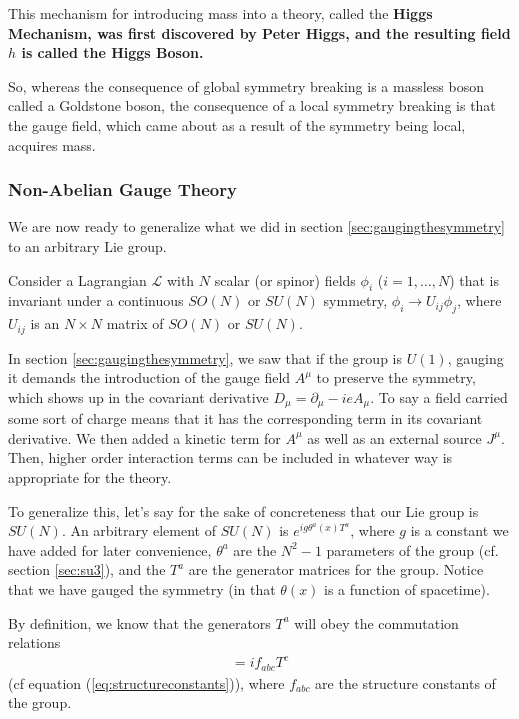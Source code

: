 \documentclass[12pt,epsf]{article}
\def\nolabel{\nonumber }
\def\nolabel{\nonumber }
\begin{document}
This mechanism for introducing mass into a theory, called the \bf Higgs
Mechanism\rm, was first discovered by Peter Higgs, and the resulting
field $h$ is called the \bf Higgs Boson\rm.  

So, whereas the consequence of global symmetry breaking is a massless
boson called a Goldstone boson, the consequence of a local symmetry
breaking is that the gauge field, which came about as a result of the
symmetry being local, acquires mass.  

\subsubsection{Non-Abelian Gauge Theory}
\label{sec:nonabeliangaugetheory}

We are now ready to generalize what we did in section
\ref{sec:gaugingthesymmetry} to an arbitrary Lie group.  

Consider a Lagrangian $\mathcal{L}$ with $N$ scalar (or spinor) fields
$\phi_i$ ($i=1,\ldots,N$) that is invariant under a continuous $SO(N)$
or $SU(N)$ symmetry, $\phi_i \rightarrow U_{ij}\phi_j$, where $U_{ij}$
is an $N\times N$ matrix of $SO(N)$ or $SU(N)$.  

In section \ref{sec:gaugingthesymmetry}, we saw that if the group is
$U(1)$, gauging it demands the introduction of the gauge field
$A^{\mu}$ to preserve the symmetry, which shows up in the covariant
derivative $D_{\mu} = \partial_{\mu} - ieA_{\mu}$.  To say
a field carried some sort of charge means that it has the corresponding
term in its covariant derivative.  We then added a kinetic term for
$A^{\mu}$ as well as an external source $J^{\mu}$.  Then, higher order
interaction terms can be included in whatever way is appropriate for
the theory.  

To generalize this, let's say for the sake of concreteness that our Lie
group is $SU(N)$.  An arbitrary element of $SU(N)$ is $e^{ig
\theta^a(x)T^a}$, where $g$ is a constant we have added for later
convenience, $\theta^a$ are the $N^2-1$ parameters of the group (cf.
section \ref{sec:su3}), and the $T^a$ are the generator matrices for
the group.  Notice that we have gauged the symmetry (in that
$\theta(x)$ is a function of spacetime).  

By definition, we know that the generators $T^a$ will obey the
commutation relations 
\begin{eqnarray}
[T^a,T^b] = if_{abc}T^c\nolabel
\end{eqnarray}
(cf equation (\ref{eq:structureconstants})), where $f_{abc}$ are the
structure constants of the group.  
\end{document}

